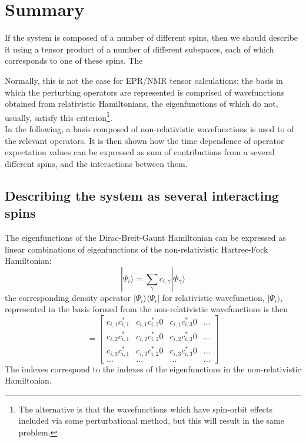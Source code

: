 \documentclass[12pt]{article}
\begin{document}
\section{Summary}
\noindent If the system is composed of a number of different spins, then
we should describe it using a tensor product of 
a number of different subspaces, each of which corresponds to one of these
spins. The 



\noindent Normally, this is not the case for EPR/NMR tensor calculations; 
the basis in which the perturbing operators are represented
is comprised of wavefunctions obtained from relativistic Hamiltonians, 
the eigenfunctions of which do not, usually, satisfy this criterion\footnote{
The alternative is that the  wavefunctions which have spin-orbit effects included via some 
perturbational method, but this will result in the same problem.}.\\

\noindent In the following, a basis composed of non-relativistic wavefunctions
is used to of the relevant operators. It is then shown how the time
dependence of operator expectation values can be expressed as sum of
contributions from a several different spins, and the interactions between them. 

\subsection{Describing the system as several interacting spins} 
\noindent  The eigenfunctions of the Dirac-Breit-Gaunt Hamiltonian can be expressed as linear combinations
of eigenfunctions of the non-relativistic Hartree-Fock Hamiltonian:
\begin{equation}
|\Psi_{i}\rangle=\sum_{\gamma}c_{i,\gamma}|\Phi_{\gamma}\rangle
\end{equation}
\noindent the corresponding density operator $ |\Psi_{i}\rangle\langle\Psi_{i}| $ for relativistic wavefunction, $|\Psi_{i}\rangle$,
represented in the basis formed from the non-relativistic wavefunctions is then
\begin{equation}
[\rho_{i}] = 
\begin{bmatrix}
c_{i,1}c^{*}_{i,1}& c_{i,1}c^{*}_{i,2}0 & c_{i,1}c^{*}_{i,3}0 & ...\\
c_{i,2}c^{*}_{i,1}& c_{i,2}c^{*}_{i,2}0 & c_{i,2}c^{*}_{i,3}0 & ...\\
c_{i,3}c^{*}_{i,1}& c_{i,3}c^{*}_{i,2}0 & c_{i,3}c^{*}_{i,3}0 & ...\\
... & ... & ... & ...
\end{bmatrix}
\end{equation}
\noindent The indexes correspond to the indexes of the eigenfunctions in the non-relativistic
Hamiltonian.\\
\end{document}
